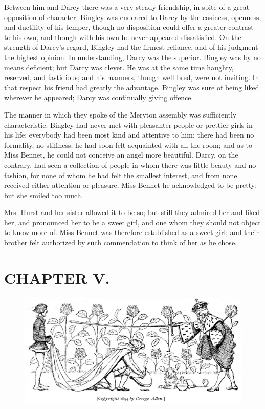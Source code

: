 Between him and Darcy there was a very steady friendship, in spite of a great opposition of character. Bingley was endeared to Darcy by the easiness, openness, and ductility of his temper, though no disposition could offer a greater contrast to his own, and though with his own he never appeared dissatisfied. On the strength of Darcy's regard, Bingley had the firmest reliance, and of his judgment the highest opinion. In understanding, Darcy was the superior. Bingley was by no means deficient; but Darcy was clever. He was at the same time haughty, reserved, and fastidious; and his manners, though well bred, were not inviting. In that respect his friend had greatly the advantage. Bingley was sure of being liked wherever he appeared; Darcy was continually giving offence.

The manner in which they spoke of the Meryton assembly was sufficiently characteristic. Bingley had never met with pleasanter people or prettier girls in his life; everybody had been most kind and attentive to him; there had been no formality, no stiffness; he had soon felt acquainted with all the room; and as to Miss Bennet, he could not conceive an angel more beautiful. Darcy, on the contrary, had seen a collection of people in whom there was little beauty and no fashion, for none of whom he had felt the smallest interest, and from none received either attention or pleasure. Miss Bennet he acknowledged to be pretty; but she smiled too much.

Mrs. Hurst and her sister allowed it to be so; but still they admired her and liked her, and pronounced her to be a sweet girl, and one whom they should not object to know more of. Miss Bennet was therefore established as a sweet girl; and their brother felt authorized by such commendation to think of her as he chose.

\chapter{CHAPTER V.}

\begin{figure}[htbp]
    \centering
    \includegraphics[width=\textwidth]{illustrations/i_051_a.jpg}
\end{figure}


